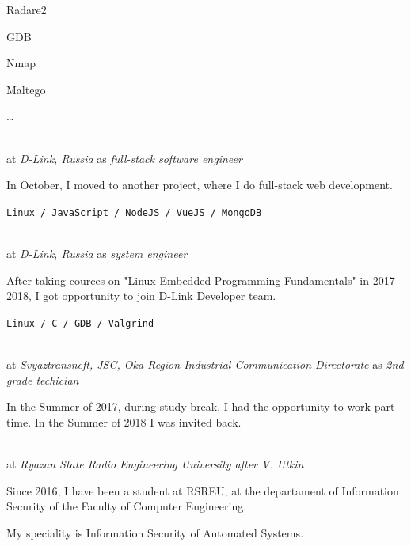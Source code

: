 \SmallSep

\begin{multicols}{3}
\begin{compactitem}[\color{Cyan}$\circ$]
    \item Radare2
    \item GDB
    \item Nmap
    \item Maltego
    \item \ldots
\end{compactitem}
\end{multicols}

\Sep


 \\
at \textit{D-Link, Russia}
as \textit{full-stack software engineer}
\SmallSep

In October, I moved to another project, where I do full-stack web development.
\SmallSep

\texttt{Linux / JavaScript / NodeJS / VueJS / MongoDB}
\SmallSep

 \\
at \textit{D-Link, Russia}
as \textit{system engineer}
\SmallSep

After taking cources on "Linux Embedded Programming Fundamentals" in 2017-2018, I got opportunity to join D-Link Developer team.
\SmallSep

\texttt{Linux / C / GDB / Valgrind}
\SmallSep

 \\
at \textit{Svyaztransneft, JSC, Oka Region Industrial Communication Directorate}
as \textit{2nd grade techician}
\SmallSep

In the Summer of 2017, during study break, I had the opportunity to work part-time. In the Summer of 2018 I was invited back.

\clearpage
\framebreak
\framebreak

 \\
at \textit{Ryazan State Radio Engineering University after V. Utkin}
\SmallSep

Since 2016, I have been a student at RSREU, at the departament of Information Security of the Faculty of Computer Engineering.

My speciality is Information Security of Automated Systems.

